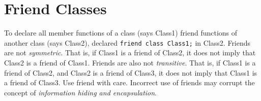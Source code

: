 \section{Friend Classes}

To declare all member functions of a class (says Class1) friend functions of 
another class (says Class2), declared \lstinline{friend class Class1;} in Class2. 
Friends are not \textit{symmetric}. That is, if Class1 is a friend of Class2, 
it does not imply that Class2 is a friend of Class1. 
Friends are also not \textit{transitive}. That is, if Class1 is a friend of Class2, and Class2 is a friend of Class3, it does not imply that Class1 is a friend of Class3.
Use friend with care. Incorrect use of friends may corrupt the concept 
of \textit{information hiding and encapsulation}.